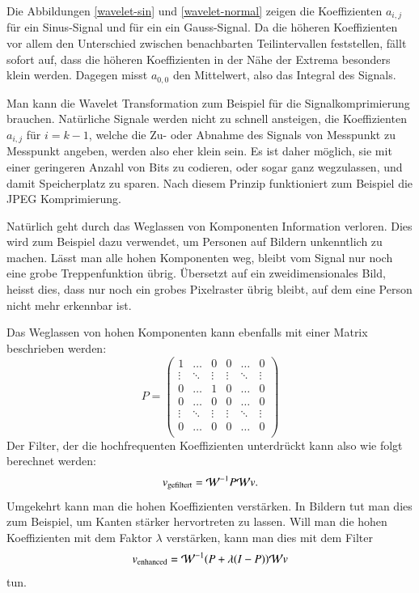 Die Abbildungen \ref{wavelet-sin} und \ref{wavelet-normal} zeigen
die Koeffizienten $a_{i,j}$ für ein Sinus-Signal und für ein
ein Gauss-Signal. Da die höheren Koeffizienten vor allem den
Unterschied zwischen benachbarten Teilintervallen feststellen,
fällt sofort auf, dass die höheren Koeffizienten in der
Nähe der Extrema besonders klein werden.
Dagegen misst $a_{0,0}$ den Mittelwert, also das Integral des Signals.

Man kann die Wavelet Transformation zum Beispiel für die Signalkomprimierung
brauchen. Natürliche Signale werden nicht zu schnell ansteigen, die
Koeffizienten $a_{i,j}$ für $i=k-1$, welche die Zu- oder Abnahme des
Signals von Messpunkt zu Messpunkt angeben, werden also eher klein
sein. Es ist daher möglich, sie mit einer geringeren Anzahl von Bits
zu codieren, oder sogar ganz wegzulassen, und damit Speicherplatz zu
sparen. Nach diesem Prinzip funktioniert zum Beispiel die JPEG Komprimierung.

Natürlich geht durch das Weglassen von Komponenten Information verloren.
Dies wird zum Beispiel dazu verwendet, um Personen auf Bildern unkenntlich
zu machen. Lässt man alle hohen Komponenten weg, bleibt vom Signal
nur noch eine grobe Treppenfunktion übrig.
Übersetzt auf ein zweidimensionales Bild, heisst dies, dass nur noch
ein grobes Pixelraster übrig bleibt, auf dem eine Person nicht mehr
erkennbar ist.

Das Weglassen von hohen Komponenten kann ebenfalls mit einer Matrix
beschrieben werden:
$$
P=\begin{pmatrix}
1&\dots&0&0&\dots&0\\
\vdots&\ddots&\vdots&\vdots&\ddots&\vdots\\
0&\dots&1&0&\dots&0\\
0&\dots&0&0&\dots&0\\
\vdots&\ddots&\vdots&\vdots&\ddots&\vdots\\
0&\dots&0&0&\dots&0\\
\end{pmatrix}
$$
Der Filter, der die hochfrequenten Koeffizienten unterdrückt kann
also wie folgt berechnet werden:
$$
v_{\text{gefiltert}}={\cal W}^{-1}P{\cal W}v.
$$
Umgekehrt kann man die hohen Koeffizienten verstärken. In Bildern tut
man dies zum Beispiel, um Kanten  stärker hervortreten zu lassen.
Will man die hohen Koeffizienten mit dem Faktor $\lambda$ verstärken,
kann man dies mit dem Filter
$$
v_{\text{enhanced}}={\cal W}^{-1}(P + \lambda(I-P)){\cal W}v
$$
tun.
